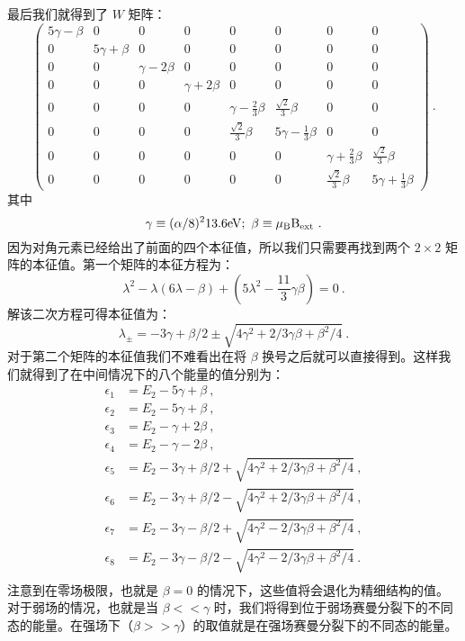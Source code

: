 最后我们就得到了 $W$ 矩阵：
\begin{equation}
\begin{pmatrix}
5\gamma -\beta & 0 & 0 & 0 & 0 & 0 & 0 & 0\\
 0 & 5\gamma +\beta  & 0 & 0 & 0 & 0 & 0 & 0\\
 0 & 0 & \gamma-2\beta & 0 & 0 & 0 & 0 & 0\\
 0 & 0 & 0 & \gamma+2\beta & 0 & 0 & 0 & 0\\
 0 & 0 & 0 & 0 & \gamma-\frac{2}{3}\beta & \frac{\sqrt{2}}{3}\beta& 0 & 0\\
 0 & 0 & 0 & 0 & \frac{\sqrt{2}}{3}\beta & 5\gamma -\frac{1}{3}\beta & 0 & 0\\
 0 & 0 & 0 & 0 & 0 & 0 & \gamma+\frac{2}{3}\beta &\frac{\sqrt{2}}{3}\beta \\
 0 & 0 & 0 & 0 & 0 & 0 & \frac{\sqrt{2}}{3}\beta & 5\gamma +\frac{1}{3}\beta
\end{pmatrix}~.
\end{equation}
其中
\begin{equation}
\gamma\equiv(\alpha/8)^2 13.6\rm{eV}; \ \beta\equiv\mu_B B_{\rm{ext}}~.
\end{equation}
因为对角元素已经给出了前面的四个本征值，所以我们只需要再找到两个 $2\times2$ 矩阵的本征值。第一个矩阵的本征方程为：
\begin{equation}
\lambda^2-\lambda(6\lambda-\beta)+(5\lambda^2-\frac{11}{3}\gamma\beta)=0~.
\end{equation}
解该二次方程可得本征值为：
\begin{equation}
\lambda_\pm = -3\gamma +\beta/2\pm \sqrt{4\gamma^2+2/3\gamma\beta+\beta^2/4}~.
\end{equation}
对于第二个矩阵的本征值我们不难看出在将 $\beta$ 换号之后就可以直接得到。这样我们就得到了在中间情况下的八个能量的值分别为：
\begin{align}
\epsilon_1 &= E_2-5\gamma+\beta~,\\
\epsilon_2 &= E_2-5\gamma+\beta~,\\
\epsilon_3 &= E_2-\gamma+2\beta~,\\
\epsilon_4 &= E_2-\gamma-2\beta~,\\
\epsilon_5 &= E_2-3\gamma +\beta/2+\sqrt{4\gamma^2+2/3\gamma\beta+\beta^2/4}~,\\
\epsilon_6 &= E_2-3\gamma +\beta/2-\sqrt{4\gamma^2+2/3\gamma\beta+\beta^2/4}~,\\
\epsilon_7 &= E_2-3\gamma -\beta/2+\sqrt{4\gamma^2-2/3\gamma\beta+\beta^2/4}~,\\
\epsilon_8 &= E_2-3\gamma -\beta/2-\sqrt{4\gamma^2-2/3\gamma\beta+\beta^2/4}~.\\
\end{align}
注意到在零场极限，也就是 $\beta=0$ 的情况下，这些值将会退化为精细结构的值。对于弱场的情况，也就是当 $\beta<<\gamma$ 时，我们将得到位于弱场赛曼分裂下的不同态的能量。在强场下（$\beta>>\gamma$）的取值就是在强场赛曼分裂下的不同态的能量。



